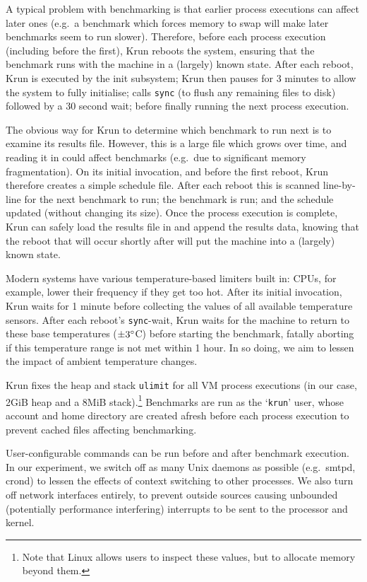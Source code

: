 \documentclass[preprint,numbers,10pt]{sigplanconf}
\newcommand{\krun}{Krun\xspace}
\begin{document}
A typical problem with benchmarking is that earlier process executions can
affect later ones (e.g.~a benchmark which forces memory to swap will make
later benchmarks seem to run slower). Therefore, before each process execution
(including before the first), \krun reboots the system, ensuring that the
benchmark runs with the machine in a (largely) known state. After each reboot, \krun is
executed by the init subsystem; \krun then pauses for 3
minutes to allow the system to fully initialise; calls \texttt{sync} (to
flush any remaining files to disk) followed by a 30 second wait; before finally running the
next process execution.

The obvious way for \krun to determine which benchmark to run next is to examine
its results file. However, this is a large file which grows over time, and
reading it in could affect benchmarks (e.g.~due to significant memory
fragmentation). On its initial invocation, and before the first reboot, \krun
therefore creates a simple schedule file. After each reboot this is scanned
line-by-line for the next benchmark to run; the benchmark is run; and the schedule
updated (without changing its size). Once the process execution is
complete, \krun can safely load the results file in and append the results data,
knowing that the reboot that will occur shortly after will put the machine into
a (largely) known state.

Modern systems have various temperature-based limiters built in:
CPUs, for example, lower their frequency if they get too hot.
After its initial invocation, \krun waits for 1 minute before collecting
the values of all available temperature sensors. After each reboot's \texttt{sync}-wait, \krun waits
for the machine to return to these base temperatures ($\pm3\degree$C) before
starting the benchmark, fatally aborting if this temperature range is not
met within 1 hour. In so doing, we aim to lessen the impact of ambient temperature changes.

\krun fixes the heap and stack \texttt{ulimit} for all VM process executions
(in our case, 2GiB heap and a 8MiB stack).\footnote{Note that Linux allows users
to inspect these values, but to allocate memory beyond them.} Benchmarks are run
as the `\texttt{krun}' user, whose account and home directory are created
afresh before each process execution to prevent cached files affecting benchmarking.

User-configurable commands can be run before and after benchmark execution. In
our experiment, we switch off as many Unix daemons as possible (e.g.~smtpd,
crond) to lessen the effects of context switching to other processes. We also
turn off network interfaces entirely, to prevent outside sources causing unbounded
(potentially performance interfering) interrupts to be sent to the processor and kernel.
\end{document}

